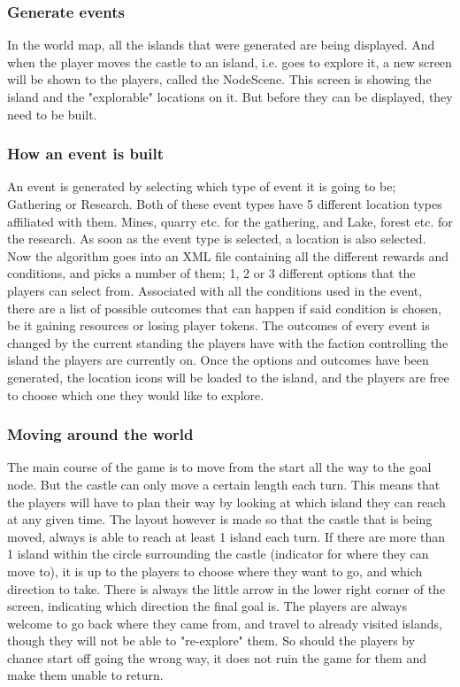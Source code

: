 \subsubsection{Generate events}
In the world map, all the islands that were generated are being displayed. And when the player moves the castle to an island, i.e. goes to explore it, a new screen will be shown to the players, called the NodeScene. This screen is showing the island and the "explorable" locations on it. But before they can be displayed, they need to be built. 

\subsubsection{How an event is built}
An event is generated by selecting which type of event it is going to be; Gathering or Research. Both of these event types have 5 different location types affiliated with them. Mines, quarry etc. for the gathering, and Lake, forest etc. for the research. As soon as the event type is selected, a location is also selected. Now the algorithm goes into an XML file containing all the different rewards and conditions, and picks a number of them; 1, 2 or 3 different options that the players can select from. Associated with all the conditions used in the event, there are a list of possible outcomes that can happen if said condition is chosen, be it gaining resources or losing player tokens. The outcomes of every event is changed by the current standing the players have with the faction controlling the island the players are currently on. 
Once the options and outcomes have been generated, the location icons will be loaded to the island, and the players are free to choose which one they would like to explore.

\subsubsection{Moving around the world}
The main course of the game is to move from the start all the way to the goal node. But the castle can only move a certain length each turn. This means that the players will have to plan their way by looking at which island they can reach at any given time. The layout however is made so that the castle that is being moved, always is able to reach at least 1 island each turn. If there are more than 1 island within the circle surrounding the castle (indicator for where they can move to), it is up to the players to choose where they want to go, and which direction to take. There is always the little arrow in the lower right corner of the screen, indicating which direction the final goal is. The players are always welcome to go back where they came from, and travel to already visited islands, though they will not be able to "re-explore" them. So should the players by chance start off going the wrong way, it does not ruin the game for them and make them unable to return.

